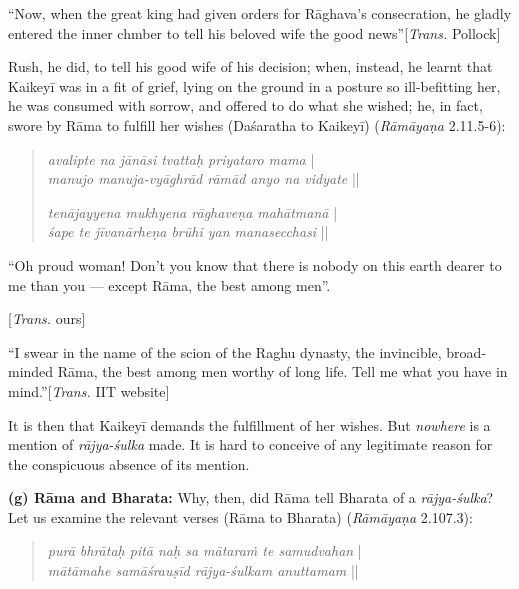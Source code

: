 \begin{myquote}
“Now, when the great king had given orders for Rāghava’s consecration, he gladly entered the inner chmber to tell his beloved wife the good news”\hfill [{\sl Trans.} Pollock]
\end{myquote}

Rush, he did, to tell his good wife of his decision; when, instead, he learnt that Kaikeyī was in a fit of grief, lying on the ground in a posture so ill-befitting her, he was consumed with sorrow, and offered to do what she wished; he, in fact, swore by Rāma to fulfill her wishes (Daśaratha to Kaikeyī) ({\sl Rāmāyaṇa} 2.11.5-6): 
\begin{quote}
{{\sl avalipte na jānāsi tvattaḥ priyataro mama}}\label{verse16} |\\
{\sl manujo manuja-vyāghrād rāmād anyo na vidyate} || 

{\sl tenājayyena mukhyena rāghaveṇa mahātmanā}\label{verse17} |\\
{\sl śape te jīvanārheṇa brūhi yan manasecchasi} ||
\end{quote}

\begin{myquote}
“Oh proud woman! Don't you know that there is nobody on this earth dearer to me than you --- except Rāma, the best among men”.

\hfill [{\sl Trans.} ours]


“I swear in the name of the scion of the Raghu dynasty, the invincible, broad-minded Rāma, the best among men worthy of long life. Tell me what you have in mind.”\hfill [{\sl Trans.} IIT website]
\end{myquote}

It is then that Kaikeyī demands the fulfillment of her wishes. But {\sl nowhere} is a mention of {\sl rājya-śulka} made. It is hard to conceive of any legitimate reason for the conspicuous absence of its mention.

\smallskip
\noindent
\textbf{(g) Rāma and Bharata:}  Why, then, did Rāma tell Bharata of a {\sl rājya-śulka}? Let us examine the relevant verses (Rāma to Bharata) ({\sl Rāmāyaṇa} 2.107.3):\\[-21pt] 
\begin{quote}
{{\sl purā bhrātaḥ pitā naḥ sa mātaraṁ te samudvahan}} |\\
{\sl mātāmahe samāśrauṣīd rājya-śulkam anuttamam} || 
\end{quote}

